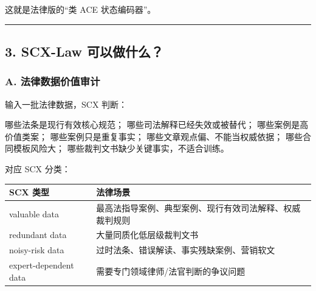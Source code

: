 \documentclass[
  12pt,
]{ctexart}
\newenvironment{Shaded}{}{}
\newcommand{\NormalTok}[1]{#1}
\begin{document}
这就是法律版的``类 ACE 状态编码器''。

\begin{center}\rule{0.5\linewidth}{0.5pt}\end{center}

\subsection{3. SCX-Law
可以做什么？}\label{scx-law-ux53efux4ee5ux505aux4ec0ux4e48}

\subsubsection{A.
法律数据价值审计}\label{a.-ux6cd5ux5f8bux6570ux636eux4ef7ux503cux5ba1ux8ba1}

输入一批法律数据，SCX 判断：

\begin{Shaded}
\begin{Highlighting}[]
\NormalTok{哪些法条是现行有效核心规范；}
\NormalTok{哪些司法解释已经失效或被替代；}
\NormalTok{哪些案例是高价值类案；}
\NormalTok{哪些案例只是重复事实；}
\NormalTok{哪些文章观点偏、不能当权威依据；}
\NormalTok{哪些合同模板风险大；}
\NormalTok{哪些裁判文书缺少关键事实，不适合训练。}
\end{Highlighting}
\end{Shaded}

对应 SCX 分类：

\begin{longtable}[]{@{}
  >{\raggedright\arraybackslash}p{}
  >{\raggedright\arraybackslash}p{}@{}}
\toprule\noalign{}
\begin{minipage}[b]{\linewidth}\raggedright
SCX 类型
\end{minipage} & \begin{minipage}[b]{\linewidth}\raggedright
法律场景
\end{minipage} \\
\midrule\noalign{}
\endhead
\bottomrule\noalign{}
\endlastfoot
valuable data &
最高法指导案例、典型案例、现行有效司法解释、权威裁判规则 \\
redundant data & 大量同质化低层级裁判文书 \\
noisy-risk data & 过时法条、错误解读、事实残缺案例、营销软文 \\
expert-dependent data & 需要专门领域律师/法官判断的争议问题 \\
\end{longtable}
\end{document}
